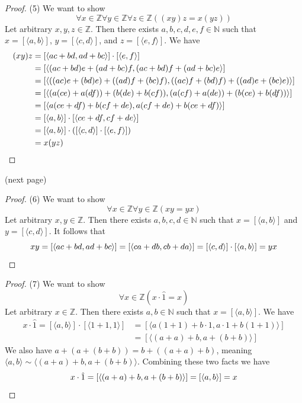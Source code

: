 \documentclass{report}
\begin{document}
\begin{proof}(5)
We want to show
\begin{equation*}
\forall x\in\mathbb Z\forall y\in\mathbb Z\forall z\in\mathbb Z((xy)z=x(yz))
\end{equation*}
Let arbitrary $x,y,z\in\mathbb Z$. Then there exists $a,b,c,d,e,f\in\mathbb N$ such that 
$x=[\langle a,b\rangle]$, $y=[\langle c,d\rangle]$, and $z=[\langle e,f\rangle]$. We have
\begin{align*}
(xy)z&=[\langle ac+bd,ad+bc\rangle]\cdot[\langle e,f\rangle]\\
&=[\langle (ac+bd)e+(ad+bc)f,(ac+bd)f+(ad+bc)e\rangle]\\
&=[\langle ((ac)e+(bd)e)+((ad)f+(bc)f),((ac)f+(bd)f)+((ad)e+(bc)e)\rangle]\\
&=[\langle (a(ce)+a(df))+(b(de)+b(cf)),(a(cf)+a(de))+(b(ce)+b(df))\rangle]\\
&=[\langle a(ce+df)+b(cf+de),a(cf+de)+b(ce+df)\rangle]\\
&=[\langle a,b\rangle]\cdot[\langle ce+df,cf+de\rangle]\\
&=[\langle a,b\rangle]\cdot([\langle c,d\rangle]\cdot[\langle e,f\rangle])\\
&=x(yz)\qedhere
\end{align*}
\end{proof}
\noindent(next page)\newpage
\begin{proof}(6)
We want to show
\begin{equation*}
\forall x\in\mathbb Z\forall y\in\mathbb Z(xy=yx)
\end{equation*}
Let arbitrary $x,y\in\mathbb Z$. Then there exists $a,b,c,d\in\mathbb N$ such that $x=[\langle a,b\rangle]$ and $y=[\langle c,d\rangle]$. It follows that 
\begin{equation*}
xy=[\langle ac+bd,ad+bc\rangle]=[\langle ca+db,cb+da\rangle]=[\langle c,d\rangle]\cdot[\langle a,b\rangle]=yx\qedhere
\end{equation*}
\end{proof}
\begin{proof}(7)
We want to show
\begin{equation*}
\forall x\in\mathbb Z(x\cdot\hat1=x)
\end{equation*}
Let arbitrary $x\in\mathbb Z$. Then there exists $a,b\in\mathbb N$ such that $x=[\langle a,b\rangle]$. We have
\begin{align*}
x\cdot\hat1=[\langle a,b\rangle]\cdot[\langle 1+1,1\rangle]&=[\langle a(1+1)+b\cdot1,a\cdot1+b(1+1)\rangle]\\
&=[\langle(a+a)+b,a+(b+b)\rangle]
\end{align*}
We also have $a+(a+(b+b))=b+((a+a)+b)$, meaning $\langle a,b\rangle\sim\langle (a+a)+b,a+(b+b)\rangle$. Combining these two facts we have
\begin{equation*}
x\cdot\hat1=[\langle(a+a)+b,a+(b+b)\rangle]=[\langle a,b\rangle]=x\qedhere
\end{equation*}
\end{proof}
\end{document}
